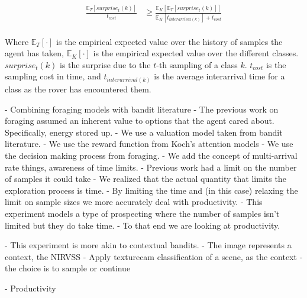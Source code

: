 \begin{align*}
	\frac{\mathbb{E}_{T}\left[surprise_{t}\left(k\right)\right]}{t_{cost}} &\geq \frac{\mathbb{E}_{K}\left[\mathbb{E}_{T}\left[surprise_{t}\left(k\right)\right]\right]}{\mathbb{E}_{K}\left[t_{interarrival(k)}\right] + t_{cost}}\\
\end{align*}

Where $\mathbb{E}_{T}\left[\cdot\right]$ is the empirical expected value over the history of samples the agent has taken, $\mathbb{E}_{K}\left[\cdot\right]$ is the empirical expected value over the different classes. $surprise_{t}(k)$ is the surprise due to the $t$-th sampling of a class $k$.  $t_{cost}$ is the sampling cost in time, and $t_{interarrival(k)}$ is the average interarrival time for a class as the rover has encountered them.



	- Combining foraging models with bandit literature 
		- The previous work on foraging assumed an inherent value to
			options that the agent cared about.  Specifically, energy stored up.
		- We use a valuation model taken from bandit literature.  
		- We use the reward function from Koch's attention models
		- We use the decision making process from foraging. 
		- We add the concept of multi-arrival rate things, awareness of time limits.
	- Previous work had a limit on the number of samples it could take
		- We realized that the actual quantity that limits the exploration process
			is time.
		- By limiting the time and (in this case) relaxing the limit on sample sizes we more accurately deal with productivity.  
	- This experiment models a type of prospecting where the number of samples isn't limited but they do take time. 
	- To that end we are looking at productivity.

	-  This experiment is more akin to contextual bandits.  
	- The image represents a context, the NIRVSS 
	- Apply texturecam classification of a scene, as the context
	- the choice is to sample or continue

	- Productivity 


